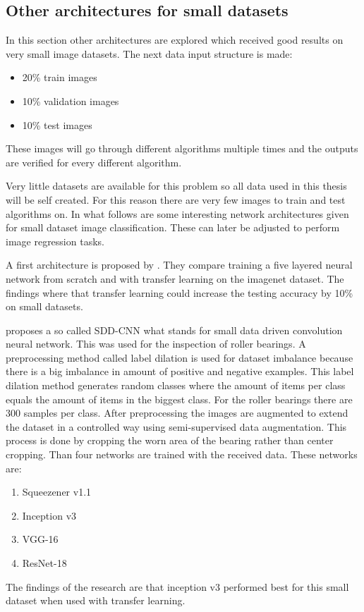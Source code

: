 \subsection{Other architectures for small datasets}

In this section other architectures are explored which received good results on very small image datasets.
The next data input structure is made:

	\begin{itemize}
	\item 20\% train images
	\item 10\% validation images
	\item 10\% test images
	\end{itemize}


These images will go through different algorithms multiple times and the outputs are verified for every different algorithm.

	Very little datasets are available for this problem so all data used in this thesis will be self created. For this reason there are very few images to train and test algorithms on. In what follows are some interesting network architectures given for small dataset image classification. These can later be adjusted to perform image regression tasks.
	
	A first architecture is proposed by \cite{Chandrarathne2019}. They compare training a five layered neural network from scratch and with transfer learning on the imagenet dataset. The findings where that transfer learning could increase the testing accuracy by 10\% on small datasets.
	
	\cite{Xu2019} proposes a so called SDD-CNN what stands for small data driven convolution neural network. This was used for the inspection of roller bearings. A preprocessing method called label dilation is used for dataset imbalance because there is a big imbalance in amount of positive and negative examples. This label dilation method generates random classes where the amount of items per class equals the amount of items in the biggest class. For the roller bearings there are 300 samples per class. After preprocessing the images are augmented to extend the dataset in a controlled way using semi-supervised data augmentation. This process is done by cropping the worn area of the bearing rather than center cropping. Than four networks are trained with the received data. These networks are: 
	\begin{enumerate}
	\item Squeezener v1.1
	\item Inception v3
	\item VGG-16 
	\item ResNet-18
	\end{enumerate}

The findings of the research are that inception v3 performed best for this small dataset when used with transfer learning.


			